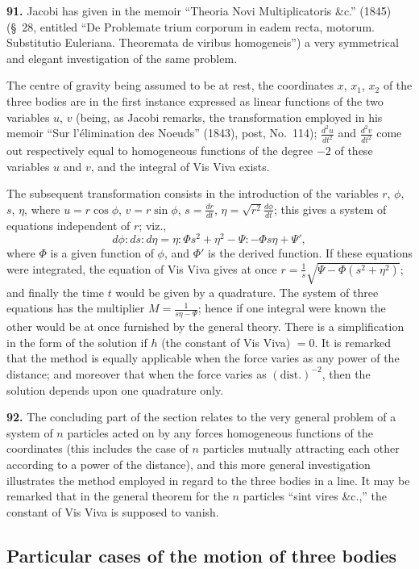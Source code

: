 \documentclass[11pt,a4paper]{book}
\begin{document}
\textbf{91.} Jacobi has given in the memoir ``Theoria Novi Multiplicatoris \&c.'' (1845) (\S~28, entitled ``De Problemate trium corporum in eadem recta, motorum. Substitutio Euleriana. Theoremata de viribus homogeneis'') a very symmetrical and elegant investigation of the same problem.

The centre of gravity being assumed to be at rest, the coordinates $x$, $x_1$, $x_2$ of the three bodies are in the first instance expressed as linear functions of the two variables $u$, $v$ (being, as Jacobi remarks, the transformation employed in his memoir ``Sur l'\'elimination des Noeuds'' (1843), post, No.~114); $\frac{d^2u}{dt^2}$ and $\frac{d^2v}{dt^2}$ come out respectively equal to homogeneous functions of the degree $-2$ of these variables $u$ and $v$, and the integral of Vis Viva exists.

The subsequent transformation consists in the introduction of the variables $r$, $\phi$, $s$, $\eta$, where $u = r\cos\phi$, $v = r\sin\phi$, $s = \frac{dr}{dt}$, $\eta = \sqrt{r^2}\frac{d\phi}{dt}$; this gives a system of equations independent of $r$; viz.,
\[
d\phi : ds : d\eta = \eta : \Phi s^2 + \eta^2 - \Psi : -\Phi s\eta + \Psi',
\]
where $\Phi$ is a given function of $\phi$, and $\Phi'$ is the derived function. If these equations were integrated, the equation of Vis Viva gives at once $r = \frac{1}{s}\sqrt{\Psi - \Phi(s^2 + \eta^2)}$; and finally the time $t$ would be given by a quadrature. The system of three equations has the multiplier $M = \frac{1}{s\eta - \Psi}$; hence if one integral were known the other would be at once furnished by the general theory. There is a simplification in the form of the solution if $h$ (the constant of Vis Viva) $= 0$. It is remarked that the method is equally applicable when the force varies as any power of the distance; and moreover that when the force varies as $(\text{dist.})^{-2}$, then the solution depends upon one quadrature only.

\textbf{92.} The concluding part of the section relates to the very general problem of a system of $n$ particles acted on by any forces homogeneous functions of the coordinates (this includes the case of $n$ particles mutually attracting each other according to a power of the distance), and this more general investigation illustrates the method employed in regard to the three bodies in a line. It may be remarked that in the general theorem for the $n$ particles ``sint vires \&c.,'' the constant of Vis Viva is supposed to vanish.

\subsection*{Particular cases of the motion of three bodies}
\end{document}
